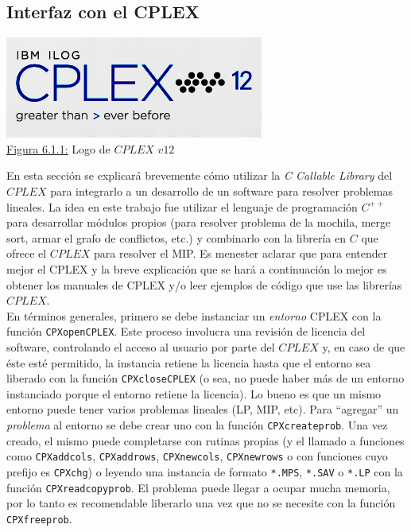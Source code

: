 \subsection{Interfaz con el CPLEX}

{
\vspace{5mm}
\centering
\includegraphics[scale=0.55]{6_apendice/cplex12.png}\\
{\footnotesize \underline{Figura 6.1.1:} Logo de $CPLEX$ $v12$}\\
\vspace{5mm}
}

En esta sección se explicará brevemente cómo utilizar la \emph{C Callable Library} del $CPLEX$ para integrarlo a un desarrollo de un software para resolver problemas lineales. La idea en este trabajo fue utilizar el lenguaje de programación $C^{++}$ para desarrollar módulos propios (para resolver problema de la mochila, merge sort, armar el grafo de conflictos, etc.) y combinarlo con la librería en $C$ que ofrece el $CPLEX$ para resolver el MIP. Es menester aclarar que para entender mejor el CPLEX y la breve explicación que se hará a continuación lo mejor es obtener los manuales de CPLEX y/o leer ejemplos de código que use las librerías $CPLEX$.\\

En términos generales, primero se debe instanciar un \emph{entorno} CPLEX con la función \verb_CPXopenCPLEX_. Este proceso involucra una revisión de licencia del software, controlando el acceso al usuario por parte del $CPLEX$ y, en caso de que éste esté permitido, la instancia retiene la licencia hasta que el entorno sea liberado con la función \verb_CPXcloseCPLEX_ (o sea, no puede haber más de un entorno instanciado porque el entorno retiene la licencia). Lo bueno es que un mismo entorno puede tener varios problemas lineales (LP, MIP, etc). Para ``agregar'' un \emph{problema} al entorno se debe crear uno con la función \verb_CPXcreateprob_. Una vez creado, el mismo puede completarse con rutinas propias (y el llamado a funciones como \verb_CPXaddcols_, \verb_CPXaddrows_, \verb_CPXnewcols_, \verb_CPXnewrows_ o con funciones cuyo prefijo es \verb_CPXchg_) o leyendo una instancia de formato \verb_*.MPS_, \verb_*.SAV_ o \verb_*.LP_ con la función \verb_CPXreadcopyprob_. El problema puede llegar a ocupar mucha memoria, por lo tanto es recomendable liberarlo una vez que no se necesite con la función \verb_CPXfreeprob_.\\

